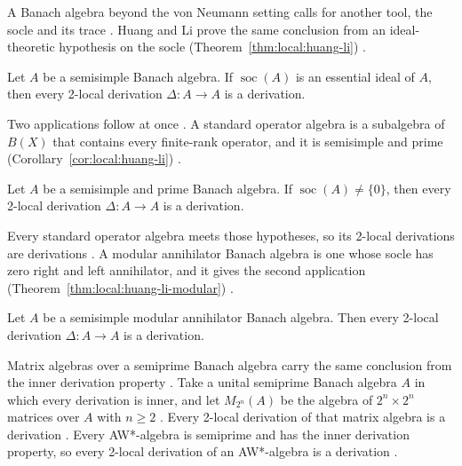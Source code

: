 A Banach algebra beyond the von Neumann setting calls for another tool, the
socle and its trace \cite[pp.~322--323]{HuangLi2021}. Huang and Li prove the same
conclusion from an ideal-theoretic hypothesis on the socle (Theorem~\ref{thm:local:huang-li})
\cite[Theorem~3.6, p.~325]{HuangLi2021}.\begin{theorem}\label{thm:local:huang-li}
Let $A$ be a semisimple Banach algebra. If $\operatorname{soc}(A)$ is an essential
ideal of $A$, then every 2-local derivation $\Delta\colon A\to A$ is a derivation.
\end{theorem}

Two applications follow at once
\cite[Theorem~4.1 and Theorem~4.5, pp.~326 and~328]{HuangLi2021}.
A standard operator algebra is a subalgebra of $B(X)$ that contains every
finite-rank operator, and it is semisimple and prime (Corollary~\ref{cor:local:huang-li}) \cite[p.~326]{HuangLi2021}.

\begin{theorem}\label{cor:local:huang-li}
Let $A$ be a semisimple and prime Banach algebra. If
$\operatorname{soc}(A)\neq\{0\}$, then every 2-local derivation
$\Delta\colon A\to A$ is a derivation.
\end{theorem}

Every standard operator algebra meets those hypotheses, so its 2-local
derivations are derivations \cite[Corollary~4.2, p.~326]{HuangLi2021}. A modular
annihilator Banach algebra is one whose socle has zero right and left
annihilator, and it gives the second application (Theorem~\ref{thm:local:huang-li-modular}) \cite[p.~328]{HuangLi2021}.

\begin{theorem}\label{thm:local:huang-li-modular}
Let $A$ be a semisimple modular annihilator Banach algebra. Then every 2-local
derivation $\Delta\colon A\to A$ is a derivation.
\end{theorem}

Matrix algebras over a semiprime Banach algebra carry the same conclusion from
the inner derivation property \cite[p.~2]{AyupovKudaybergenov2014Matrix}. Take
a unital semiprime Banach algebra $A$ in which every derivation is inner, and
let $M_{2^n}(A)$ be the algebra of $2^n\times 2^n$ matrices over $A$ with
$n\geq2$ \cite[Theorem~2.1, p.~2]{AyupovKudaybergenov2014Matrix}. Every 2-local
derivation of that matrix algebra is a derivation
\cite[Theorem~2.1, p.~2]{AyupovKudaybergenov2014Matrix}. Every AW*-algebra is
semiprime and has the inner derivation property, so every 2-local derivation of
an AW*-algebra is a derivation
\cite[Theorem~3.1, p.~11]{AyupovKudaybergenov2014Matrix}.

